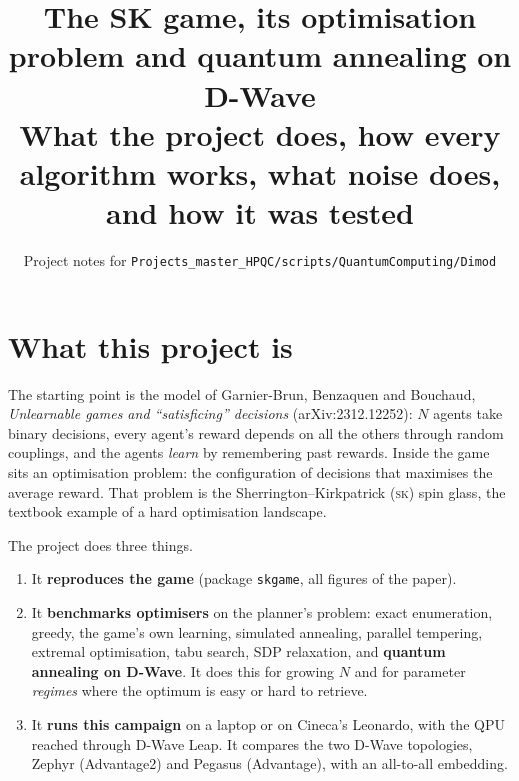 \documentclass[11pt,a4paper]{article}
\title{The SK game, its optimisation problem and quantum annealing on D-Wave\\[4pt]
\large What the project does, how every algorithm works, what noise does, and how it was tested}
\author{Project notes for \texttt{Projects\_master\_HPQC/scripts/QuantumComputing/Dimod}}
\date{}
\newcommand{\code}[1]{\nolinkurl{#1}}
\newcommand{\SK}{\textsc{sk}}
\begin{document}
\maketitle
\tableofcontents
\newpage

\section{What this project is}

The starting point is the model of Garnier-Brun, Benzaquen and Bouchaud, \emph{Unlearnable games and
``satisficing'' decisions} (arXiv:2312.12252): $N$ agents take binary decisions, every agent's reward
depends on all the others through random couplings, and the agents \emph{learn} by remembering past rewards.
Inside the game sits an optimisation problem: the configuration of decisions that maximises the average
reward. That problem is the Sherrington--Kirkpatrick (\SK) spin glass, the textbook example of a hard
optimisation landscape.

The project does three things.
\begin{enumerate}
\item It \textbf{reproduces the game} (package \code{skgame}, all figures of the paper).
\item It \textbf{benchmarks optimisers} on the planner's problem: exact enumeration, greedy, the game's own learning,
simulated annealing, parallel tempering, extremal optimisation, tabu search, SDP relaxation, and
\textbf{quantum annealing on D-Wave}. It does this for growing $N$ and for parameter \emph{regimes} where the
optimum is easy or hard to retrieve.
\item It \textbf{runs this campaign} on a laptop or on Cineca's Leonardo, with the QPU reached through D-Wave Leap.
It compares the two D-Wave topologies, Zephyr (Advantage2) and Pegasus (Advantage), with an all-to-all embedding.
\end{enumerate}
\end{document}
